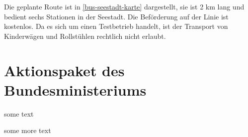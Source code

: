 Die geplante Route ist in \ref{bus-seestadt-karte} dargestellt, sie ist 2 \si{\kilo\metre} lang und bedient sechs Stationen in der Seestadt. Die Beförderung auf der Linie ist kostenlos. Da es sich um einen Testbetrieb handelt, ist der Transport von Kinderwägen und Rollstühlen rechtlich nicht erlaubt.


\section{Aktionspaket des Bundesministeriums}

some text

some more text
